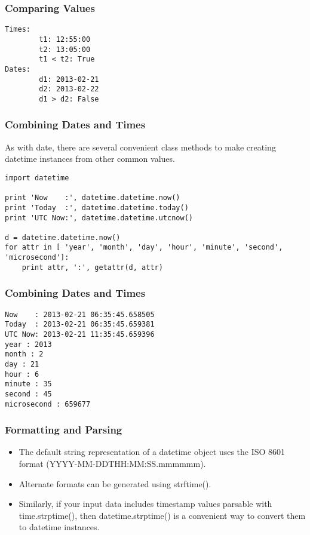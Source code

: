 \begin{frame}[fragile]\frametitle{Comparing Values}
\begin{lstlisting}
Times:
        t1: 12:55:00
        t2: 13:05:00
        t1 < t2: True
Dates:
        d1: 2013-02-21
        d2: 2013-02-22
        d1 > d2: False
\end{lstlisting}
\end{frame}


\begin{frame}[fragile]\frametitle{Combining Dates and Times}
As with date, there are several convenient class methods to make creating datetime instances from other common values.
\begin{lstlisting}
import datetime

print 'Now    :', datetime.datetime.now()
print 'Today  :', datetime.datetime.today()
print 'UTC Now:', datetime.datetime.utcnow()

d = datetime.datetime.now()
for attr in [ 'year', 'month', 'day', 'hour', 'minute', 'second', 'microsecond']:
    print attr, ':', getattr(d, attr)
\end{lstlisting}
\end{frame}


\begin{frame}[fragile]\frametitle{Combining Dates and Times}
\begin{lstlisting}
Now    : 2013-02-21 06:35:45.658505
Today  : 2013-02-21 06:35:45.659381
UTC Now: 2013-02-21 11:35:45.659396
year : 2013
month : 2
day : 21
hour : 6
minute : 35
second : 45
microsecond : 659677
\end{lstlisting}
\end{frame}


\begin{frame}[fragile]\frametitle{Formatting and Parsing}
\begin{itemize}
\item The default string representation of a datetime object uses the ISO 8601 format (YYYY-MM-DDTHH:MM:SS.mmmmmm). 
\item Alternate formats can be generated using strftime(). 
\item Similarly, if your input data includes timestamp values parsable with time.strptime(), then datetime.strptime() is a convenient way to convert them to datetime instances.

\end{itemize}
\end{frame}

